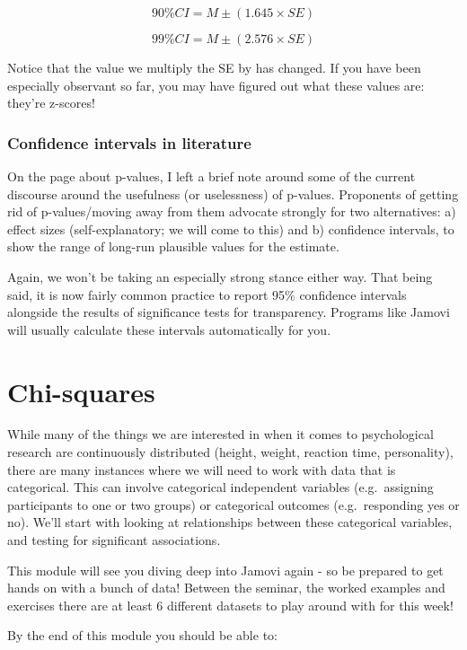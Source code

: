 \documentclass[
]{book}
\begin{document}
\[
90\% CI = M \pm (1.645 \times SE)
\]

\[
99\% CI = M \pm (2.576 \times SE)
\]

Notice that the value we multiply the SE by has changed. If you have been especially observant so far, you may have figured out what these values are: they're z-scores!

\hypertarget{confidence-intervals-in-literature}{%
\subsection{Confidence intervals in literature}\label{confidence-intervals-in-literature}}

On the page about p-values, I left a brief note around some of the current discourse around the usefulness (or uselessness) of p-values. Proponents of getting rid of p-values/moving away from them advocate strongly for two alternatives: a) effect sizes (self-explanatory; we will come to this) and b) confidence intervals, to show the range of long-run plausible values for the estimate.

Again, we won't be taking an especially strong stance either way. That being said, it is now fairly common practice to report 95\% confidence intervals alongside the results of significance tests for transparency. Programs like Jamovi will usually calculate these intervals automatically for you.

\hypertarget{chi-squares}{%
\chapter{Chi-squares}\label{chi-squares}}

While many of the things we are interested in when it comes to psychological research are continuously distributed (height, weight, reaction time, personality), there are many instances where we will need to work with data that is categorical. This can involve categorical independent variables (e.g.~assigning participants to one or two groups) or categorical outcomes (e.g.~responding yes or no). We'll start with looking at relationships between these categorical variables, and testing for significant associations.

This module will see you diving deep into Jamovi again - so be prepared to get hands on with a bunch of data! Between the seminar, the worked examples and exercises there are at least 6 different datasets to play around with for this week!

By the end of this module you should be able to:
\end{document}

